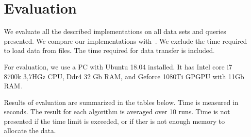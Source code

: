 \section{Evaluation}

We evaluate all the described implementations on all data sets and queries presented.
We compare our implementations with~\cite{Azimov:2018:CPQ:3210259.3210264}.
We exclude the time required to load data from files.
The time required for data transfer is included.

For evaluation, we use a PC with Ubuntu 18.04 installed.
It has Intel core i7 8700k 3,7HGz CPU, Ddr4 32 Gb RAM, and Geforce 1080Ti GPGPU with 11Gb RAM.

Results of evaluation are summarized in the tables below.
Time is measured in seconds.
The result for each algorithm is averaged over 10 runs.
Time is not presented if the time limit is exceeded, or if ther is not enough memory to allocate the data.

